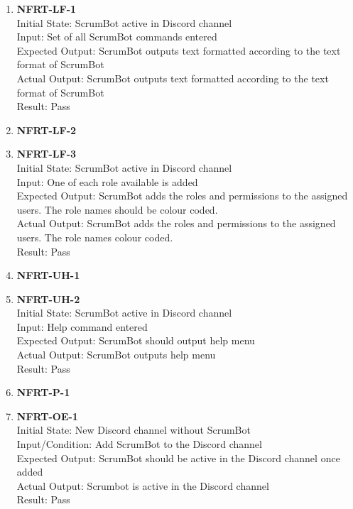 \documentclass[12pt, titlepage]{article}
\begin{document}
\begin{enumerate}
    \item{\textbf{NFRT-LF-1}}\\
    Initial State: ScrumBot active in Discord channel\\
    Input: Set of all ScrumBot commands entered\\
    Expected Output: ScrumBot outputs text formatted according to the text format of ScrumBot\\
    Actual Output: ScrumBot outputs text formatted according to the text format of ScrumBot\\
    Result: Pass

    \item{\textbf{NFRT-LF-2}}\\

    \item{\textbf{NFRT-LF-3}}\\
    Initial State: ScrumBot active in Discord channel\\
    Input: One of each role available is added\\
    Expected Output: ScrumBot adds the roles and permissions to the assigned users. The role names should be colour coded.\\
    Actual Output: ScrumBot adds the roles and permissions to the assigned users. The role names colour coded.\\
    Result: Pass
    
    \item{\textbf{NFRT-UH-1}}\\

    \item{\textbf{NFRT-UH-2}}\\
    Initial State: ScrumBot active in Discord channel\\
    Input: Help command entered\\
    Expected Output: ScrumBot should output help menu\\
    Actual Output: ScrumBot outputs help menu\\
    Result: Pass
    
    \item{\textbf{NFRT-P-1}}\\

    \item{\textbf{NFRT-OE-1}}\\
    Initial State: New Discord channel without ScrumBot\\
    Input/Condition: Add ScrumBot to the Discord channel\\
    Expected Output: ScrumBot should be active in the Discord channel once added\\
    Actual Output: Scrumbot is active in the Discord channel\\
    Result: Pass
    

\end{enumerate}
\end{document}
